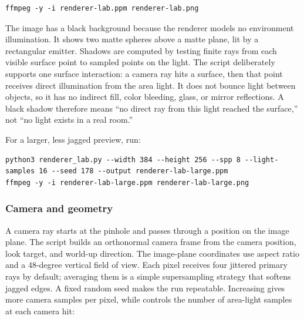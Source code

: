 \begin{verbatim}
ffmpeg -y -i renderer-lab.ppm renderer-lab.png
\end{verbatim}

The image has a black background because the renderer models no environment illumination. It shows two matte spheres above a matte plane, lit by a rectangular emitter. Shadows are computed by testing finite rays from each visible surface point to sampled points on the light. The script deliberately supports one surface interaction: a camera ray hits a surface, then that point receives direct illumination from the area light. It does not bounce light between objects, so it has no indirect fill, color bleeding, glass, or mirror reflections. A black shadow therefore means ``no direct ray from this light reached the surface,'' not ``no light exists in a real room.''

For a larger, less jagged preview, run:

\begin{verbatim}
python3 renderer_lab.py --width 384 --height 256 --spp 8 --light-samples 16 --seed 178 --output renderer-lab-large.ppm
ffmpeg -y -i renderer-lab-large.ppm renderer-lab-large.png
\end{verbatim}


\subsubsection{Camera and geometry}\label{04-visual-computing-ii-ch035-camera-and-geometry}

\hypertarget{04-visual-computing-ii-ch035-camera-and-geometry}{}

A camera ray starts at the pinhole and passes through a position on the image plane. The script builds an orthonormal camera frame from the camera position, look target, and world-up direction. The image-plane coordinates use aspect ratio and a 48-degree vertical field of view. Each pixel receives four jittered primary rays by default; averaging them is a simple supersampling strategy that softens jagged edges. A fixed random seed makes the run repeatable. Increasing  gives more camera samples per pixel, while  controls the number of area-light samples at each camera hit:

